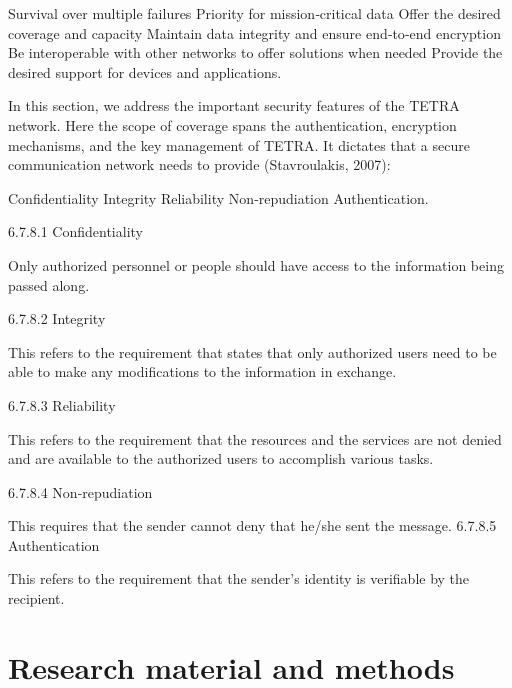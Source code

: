 \documentclass[english, 12pt, a4paper, elec, utf8, a-1b, online]{aaltothesis}
\begin{document}
    Survival over multiple failures
    Priority for mission‐critical data
    Offer the desired coverage and capacity
    Maintain data integrity and ensure end‐to‐end encryption
    Be interoperable with other networks to offer solutions when needed
    Provide the desired support for devices and applications.




In this section, we address the important security features of the TETRA network.
Here the scope of coverage spans the authentication, encryption mechanisms, and the key management of TETRA.
It dictates that a secure communication network needs to provide (Stavroulakis, 2007):

    Confidentiality
    Integrity
    Reliability
    Non‐repudiation
    Authentication.

6.7.8.1 Confidentiality

    Only authorized personnel or people should have access to the information being passed along.

6.7.8.2 Integrity

    This refers to the requirement that states that only authorized users need to be able to make any modifications to the information in exchange.

6.7.8.3 Reliability

    This refers to the requirement that the resources and the services are not denied and are available to the authorized users to accomplish various tasks.

6.7.8.4 Non‐repudiation

This requires that the sender cannot deny that he/she sent the message.
6.7.8.5 Authentication

    This refers to the requirement that the sender's identity is verifiable by the recipient.

\clearpage

\section{Research material and methods}

\end{document}
